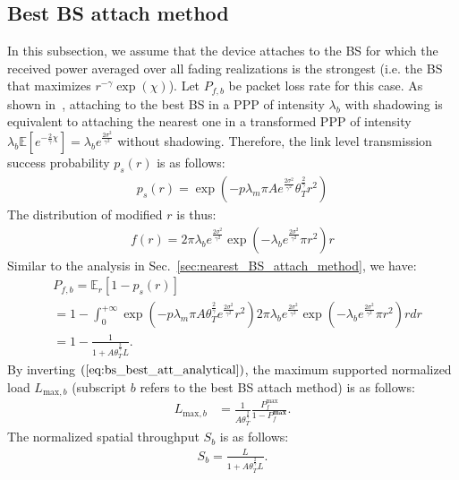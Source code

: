 \subsection{Best BS attach method}
In this subsection, we assume that the device attaches to the BS for which the received power averaged over all fading realizations is the strongest (i.e. the BS that maximizes $r^{-\gamma}\exp(\chi)$). Let $P_{f,b} $ be packet loss rate for this case. As shown in~\cite[lemma 1]{dhillon2014downlink},  attaching to the best BS in a PPP of intensity $\lambda_{b}$ with shadowing is equivalent to attaching the nearest one in a transformed PPP of intensity $\lambda_{b} \mathbb{E}\left[ e^{-\frac{2}{\gamma}\chi}\right] = \lambda_{b} e^{\frac{2\sigma^2}{\gamma^2}}$ without shadowing. 
Therefore, the link level transmission success probability $p_{s}(r)$ is as follows:
\begin{align}
	\label{eq:succ_proba_with_modified_r}
	p_{s}(r) = \exp(-p \lambda_{m} \pi A e^{\frac{2\sigma^2}{\gamma^2}} \theta_{T}^{\frac{2}{\gamma}} r^2 )
\end{align}
The distribution of modified $r$ is thus:
\begin{align}
	\label{eq:pdf_modified_r}
	f(r) = 2 \pi \lambda_b e^{\frac{2\sigma^2}{\gamma^2}}  \exp( -\lambda_b  e^{\frac{2\sigma^2}{\gamma^2}} \pi r^2 ) r 
\end{align}
Similar to the analysis in Sec.~\ref{sec:nearest_BS_attach_method}, we have:
\begin{align}
\label{eq:bs_best_att_analytical}
&P_{f,b}= \mathbb{E}_{r}\left[ 1-p_{s}\left(r\right) \right]  \nonumber\\
&= 1 -\int_{0}^{+\infty}  \exp(-p \lambda_{m} \pi A \theta_{T}^{\frac{2}{\gamma}} e^{\frac{2\sigma^2}{\gamma^2}}  r^2 )  2 \pi \lambda_b e^{\frac{2\sigma^2}{\gamma^2}}  \exp( -\lambda_b  e^{\frac{2\sigma^2}{\gamma^2}} \pi r^2 ) r dr \nonumber\\
&= 1-\frac{1}{ 1 +  A \theta_{T}^{\frac{2}{\gamma}} L }.
\end{align}
By inverting $(\ref{eq:bs_best_att_analytical})$, the maximum supported normalized load $L_{\text{max}, b}$ (subscript $b$ refers to the best BS attach method) is as follows:
\begin{align}
	L_{\text{max},b} &=\frac{1}{A \theta_{T}^{\frac{2}{\gamma}}  } 
	\frac{P_{f}^{\text{max}}}{1 - P_{f}^{\textbf{max}}}. 
\end{align}
The normalized spatial throughput $S_{b}$ is as follows:
\begin{align}
	S_{b} =  \frac{L}{1 +  A  \theta_{T}^{\frac{2}{\gamma}} L }.
\end{align}

